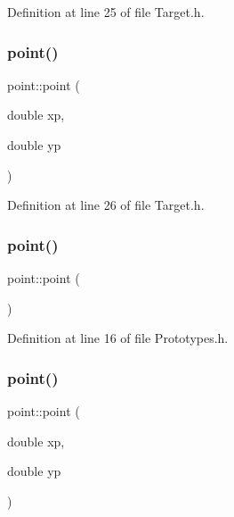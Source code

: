 Definition at line 25 of file Target.\+h.

\mbox{\label{classpoint_a35a81eb47d874ab0ad36577aad5fc464}} 
\subsubsection{\texorpdfstring{point()}{point()}\hspace{0.1cm}{\footnotesize\ttfamily [4/6]}}
{\footnotesize\ttfamily point\+::point (\begin{DoxyParamCaption}\item[{double}]{xp,  }\item[{double}]{yp }\end{DoxyParamCaption})\hspace{0.3cm}{\ttfamily [inline]}}



Definition at line 26 of file Target.\+h.

\mbox{\label{classpoint_a5fe21d4a4539320bf0f5caf1218d31c8}} 
\subsubsection{\texorpdfstring{point()}{point()}\hspace{0.1cm}{\footnotesize\ttfamily [5/6]}}
{\footnotesize\ttfamily point\+::point (\begin{DoxyParamCaption}{ }\end{DoxyParamCaption})\hspace{0.3cm}{\ttfamily [inline]}}



Definition at line 16 of file Prototypes.\+h.

\mbox{\label{classpoint_a35a81eb47d874ab0ad36577aad5fc464}} 
\subsubsection{\texorpdfstring{point()}{point()}\hspace{0.1cm}{\footnotesize\ttfamily [6/6]}}
{\footnotesize\ttfamily point\+::point (\begin{DoxyParamCaption}\item[{double}]{xp,  }\item[{double}]{yp }\end{DoxyParamCaption})\hspace{0.3cm}{\ttfamily [inline]}}



